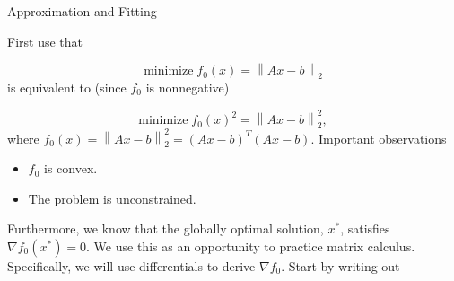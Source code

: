 \begin{chapter}{Approximation and Fitting}



    First use that

    \[\text{minimize} \; f_0(x) = \left\lVert Ax - b  \right\rVert_{2}\]
    is equivalent to (since $f_0$ is nonnegative) 

    \[\text{minimize} \; f_0(x)^2  = \left\lVert Ax - b  \right\rVert_{2}^2, \]
    where $f_0(x) = \left\lVert Ax - b \right\rVert_{2}^2 = \left(Ax-b\right)^T\left(Ax-b\right)$. Important observations
    \begin{itemize}
        \item $f_0$ is convex.
        \item The problem is unconstrained.
    \end{itemize}
    Furthermore, we know that the globally optimal solution, $x^*$, satisfies $\nabla f_0(x^*) = 0$. We use this as an opportunity
    to practice matrix calculus. Specifically, we will use differentials to derive $\nabla f_0$. Start by writing out


\end{chapter}
